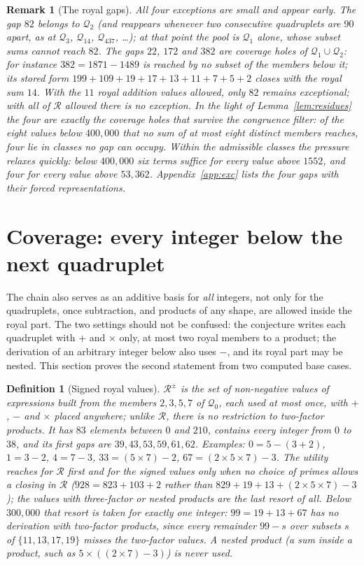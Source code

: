 \documentclass[11pt,a4paper]{article}
\newtheorem{definition}{Definition}
\newtheorem{remark}{Remark}
\newcommand{\Q}{\mathcal{Q}}
\newcommand{\R}{\mathcal{R}}
\begin{document}
\begin{remark}[The royal gaps]
All four exceptions are small and appear early. The gap $82$ belongs to
$\Q_2$ (and reappears whenever two consecutive quadruplets are $90$ apart,
as at $\Q_3$, $\Q_{14}$, $\Q_{437}$, \dots); at that point the pool is
$\Q_1$ alone, whose subset sums cannot reach $82$. The gaps $22$, $172$ and
$382$ are coverage holes of $\Q_1\cup\Q_2$: for instance $382=1871-1489$
is reached by no subset of the members below it; its stored form
$199+109+19+17+13+11+7+5+2$ closes with the royal sum $14$. With the $11$ royal
addition values allowed, only $82$ remains exceptional; with all of $\R$
allowed there is no exception. In the light of Lemma~\ref{lem:residues}
the four are exactly the coverage holes that survive the congruence filter:
of the eight values below $400{,}000$ that no sum of at most eight distinct
members reaches, four lie in classes no gap can occupy. Within the
admissible classes the pressure relaxes quickly: below $400{,}000$ six
terms suffice for every value above $1552$, and four for every value above
$53{,}362$. Appendix~\ref{app:exc} lists the four gaps with their forced
representations.
\end{remark}

\section{Coverage: every integer below the next quadruplet}
\label{sec:cover}

The chain also serves as an additive basis for \emph{all} integers, not
only for the quadruplets, once subtraction, and products of any shape, are
allowed inside the royal part. The two settings should not be confused:
the conjecture writes each quadruplet with $+$ and $\times$ only, at most
two royal members to a product; the derivation of an arbitrary integer
below also uses $-$, and its royal part may be nested. This section proves
the second statement from two computed base cases.

\begin{definition}[Signed royal values]
$\R^{\pm}$ is the set of non-negative values of expressions built from
the members $2,3,5,7$ of $\Q_0$, each used at most once, with $+$, $-$ and
$\times$ placed anywhere; unlike $\R$, there is no restriction to
two-factor products. It has $83$ elements between $0$ and $210$,
contains every integer from $0$ to $38$, and its first gaps are
$39, 43, 53, 59, 61, 62$. Examples: $0=5-(3+2)$, $1=3-2$, $4=7-3$,
$33=(5\times7)-2$, $67=(2\times5\times7)-3$. The utility reaches for
$\R$ first and for the signed values only when no choice of primes allows
a closing in $\R$ ($928=823+103+2$ rather than
$829+19+13+(2\times5\times7)-3$); the values with three-factor or
nested products are the last resort of all. Below $300{,}000$ that resort
is taken for exactly one integer: $99=19+13+67$ has no derivation with
two-factor products, since every remainder $99-s$ over subsets $s$ of
$\{11,13,17,19\}$ misses the two-factor values. A nested product (a sum
inside a product, such as $5\times((2\times7)-3)$) is never used.
\end{definition}
\end{document}
